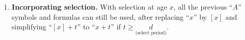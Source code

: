 \begin{enumerate}
\begin{enumerate}[label={(\arabic*)}]
\begin{pf}
Note that
\[
\text{EPV}=\sum_{k=0}^{n-1}(1+j)^{k}v^{k+1}\px[k]{x}\qx{x+k}
=\frac{1}{1+j}\sum_{k=0}^{n-1}\underbrace{\qty(\frac{1+i}{1+j})^{-(k+1)}}_{\vc{(1+i^{*})^{-(k+1)}}}\mgc{\px[k]{x}\qx{x+k}},
\]
and that when \(i^*=0\), we have
\(A_{x:\angl{n}i^{*}}=\expv{\indicset{T_x<n}}=\qx[n]{x}\), where
\(\indicset{\cdot}\) denotes the indicator function.
\end{pf}
\end{enumerate}
\item \textbf{Incorporating selection.} With selection at age \(x\), all the
previous ``\(A\)'' symbols and formulas can still be used, after replacing
``\(x\)'' by \([x]\) and simplifying ``\([x]+t\)'' to ``\(x+t\)'' if \(t\ge
\underset{\text{(select period)}}{d}\).
\end{enumerate}
